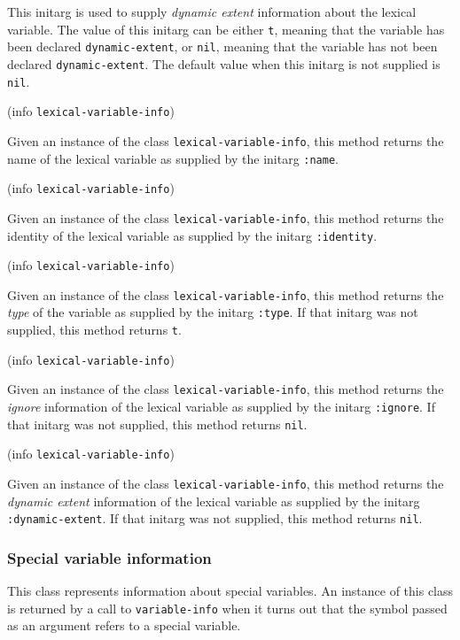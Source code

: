 
This initarg is used to supply \emph{dynamic extent} information about
the lexical variable.  The value of this initarg can be either
\texttt{t}, meaning that the variable has been declared
\texttt{dynamic-extent}, or \texttt{nil}, meaning that the variable
has not been declared \texttt{dynamic-extent}.  The default value when
this initarg is not supplied is \texttt{nil}. 

 {(info {\tt lexical-variable-info})}

Given an instance of the class \texttt{lexical-variable-info}, this
method returns the name of the lexical variable as supplied by the
initarg \texttt{:name}.

 {(info {\tt lexical-variable-info})}

Given an instance of the class \texttt{lexical-variable-info}, this
method returns the identity of the lexical variable as supplied by the
initarg \texttt{:identity}.

 {(info {\tt lexical-variable-info})}

Given an instance of the class \texttt{lexical-variable-info}, this
method returns the \emph{type} of the variable as supplied by the
initarg \texttt{:type}.  If that initarg was not supplied, this method
returns \texttt{t}.

 {(info {\tt lexical-variable-info})}

Given an instance of the class \texttt{lexical-variable-info}, this
method returns the \emph{ignore} information of the lexical variable as
supplied by the initarg \texttt{:ignore}.  If that initarg was not
supplied, this method returns \texttt{nil}.

 {(info {\tt lexical-variable-info})}

Given an instance of the class \texttt{lexical-variable-info}, this
method returns the \emph{dynamic extent} information of the lexical
variable as supplied by the initarg \texttt{:dynamic-extent}.  If that
initarg was not supplied, this method returns \texttt{nil}.

\subsubsection{Special variable information}


This class represents information about special variables.   An
instance of this class is returned by a call to \texttt{variable-info}
when it turns out that the symbol passed as an argument refers to a
special variable.


